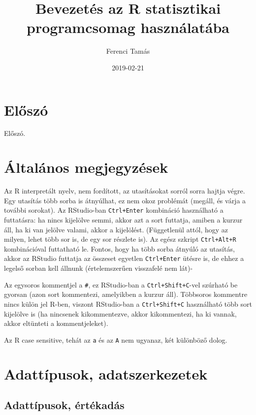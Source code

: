 \documentclass[]{book}
\title{Bevezetés az R statisztikai programcsomag használatába}
\author{Ferenci Tamás}
\date{2019-02-21}
\begin{document}
\maketitle

{
\setcounter{tocdepth}{1}
\tableofcontents
}
\chapter{Előszó}\label{eloszo}

Előszó.

\chapter{Általános megjegyzések}\label{altalanos-megjegyzesek}

Az R interpretált nyelv, nem fordított, az utasításokat sorról sorra
hajtja végre. Egy utasítás több sorba is átnyúlhat, ez nem okoz
problémát (megáll, és várja a további sorokat). Az RStudio-ban
\texttt{Ctrl+Enter} kombináció használható a futtatásra: ha nincs
kijelölve semmi, akkor azt a sort futtatja, amiben a kurzur áll, ha ki
van jelölve valami, akkor a kijelölést. (Függetlenül attól, hogy az
milyen, lehet több sor is, de egy sor részlete is). Az egész szkript
\texttt{Ctrl+Alt+R} kombinációval futtatható le. Fontos, hogy ha több
sorba átnyúló az utasítás, akkor az RStudio futtatja az összeset
egyetlen \texttt{Ctrl+Enter} ütésre is, de ehhez a legelső sorban kell
állnunk (értelemszerűen visszafelé nem lát)-

Az egysoros kommentjel a \texttt{\#}, ez RStudio-ban a
\texttt{Ctrl+Shift+C}-vel szúrható be gyorsan (azon sort kommentezi,
amelyikben a kurzur áll). Többsoros kommentre nincs külön jel R-ben,
viszont RStudio-ban a \texttt{Ctrl+Shift+C} használható több sort
kijelölve is (ha nincsenek kikommentezve, akkor kikommentezi, ha ki
vannak, akkor eltünteti a kommentjeleket).

Az R case sensitive, tehát az \texttt{a} és az \texttt{A} nem ugyanaz,
két különböző dolog.

\chapter{Adattípusok,
adatszerkezetek}\label{adattipusok-adatszerkezetek}

\section{Adattípusok, értékadás}\label{adattipusok-ertekadas}
\end{document}
